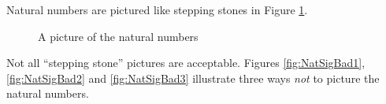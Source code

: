 Natural numbers are pictured like stepping stones in Figure \ref{fig:nat-numbers}.

\begin{figure}[h]
  \centering
  \caption{A picture of the natural numbers}
  \label{fig:nat-numbers}
\end{figure}


Not all ``stepping stone'' pictures are acceptable.
Figures \ref{fig:NatSigBad1}, \ref{fig:NatSigBad2} and \ref{fig:NatSigBad3} illustrate three ways \emph{not} to picture the natural numbers.

